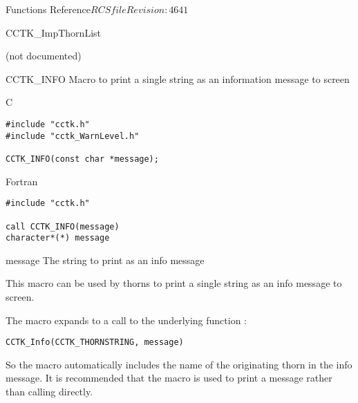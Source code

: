 \begin{cactuspart}{ Functions Reference}{$RCSfile$}{$Revision: 4641 $}
\begin{FunctionDescription}{CCTK\_ImpThornList}
\begin{ErrorSection}
\begin{Error}{}
(not documented)
\end{Error}
\end{ErrorSection}

\end{FunctionDescription}



\begin{FunctionDescription}{CCTK\_INFO}
\label{CCTK-INFO}
Macro to print a single string as an information message to screen

\begin{SynopsisSection}
\begin{Synopsis}{C}
\begin{verbatim}
#include "cctk.h"
#include "cctk_WarnLevel.h"

CCTK_INFO(const char *message);
\end{verbatim}
\end{Synopsis}
\begin{Synopsis}{Fortran}
\begin{verbatim}
#include "cctk.h"

call CCTK_INFO(message)
character*(*) message
\end{verbatim}
\end{Synopsis}
\end{SynopsisSection}

\begin{ParameterSection}
\begin{Parameter}{message}
The string to print as an info message
\end{Parameter}
\end{ParameterSection}

\begin{Discussion}
This macro can be used by thorns to print a single string as an info message
to screen.

The macro  expands to a call to the
underlying function :

\begin{verbatim}
CCTK_Info(CCTK_THORNSTRING, message)
\end{verbatim}

So the macro automatically includes the name of the originating thorn in the
info message. It is recommended that the macro  is used
to print a message rather than calling  directly.


\end{Discussion}
\end{FunctionDescription}
\end{cactuspart}
